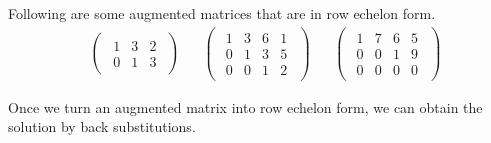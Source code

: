 \documentclass{huhtakm-template-book}
\begin{document}
\begin{eg}
    Following are some augmented matrices that are in row echelon form.
    \begin{align*}
        &\begin{pmatrix}
            \begin{array}{cc|c}
                1 & 3 & 2\\
                0 & 1 & 3
            \end{array}
        \end{pmatrix} & &\begin{pmatrix}
            \begin{array}{ccc|c}
                1 & 3 & 6 & 1\\
                0 & 1 & 3 & 5\\
                0 & 0 & 1 & 2
            \end{array}
        \end{pmatrix} & &\begin{pmatrix}
            \begin{array}{ccc|c}
                1 & 7 & 6 & 5\\
                0 & 0 & 1 & 9\\
                0 & 0 & 0 & 0
            \end{array}
        \end{pmatrix}
    \end{align*}
\end{eg}
Once we turn an augmented matrix into row echelon form, we can obtain the solution by back substitutions.
\newpage
\end{document}
